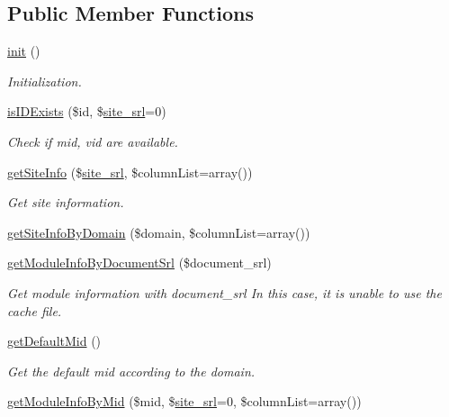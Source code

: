 \subsection*{Public Member Functions}
\begin{DoxyCompactItemize}
\item 
\hyperlink{classmoduleModel_a1d6fb4cdd3dd5e068e71cacc551f517c}{init} ()
\begin{DoxyCompactList}\small\item\em Initialization. \end{DoxyCompactList}\item 
\hyperlink{classmoduleModel_a5f53ae1101876e8967cc3c40e54badcd}{is\+I\+D\+Exists} (\$id, \$\hyperlink{ko_8install_8php_a8b1406b4ad1048041558dce6bfe89004}{site\+\_\+srl}=0)
\begin{DoxyCompactList}\small\item\em Check if mid, vid are available. \end{DoxyCompactList}\item 
\hyperlink{classmoduleModel_a96446e3b8e031ec1264c7187cb1384a5}{get\+Site\+Info} (\$\hyperlink{ko_8install_8php_a8b1406b4ad1048041558dce6bfe89004}{site\+\_\+srl}, \$column\+List=array())
\begin{DoxyCompactList}\small\item\em Get site information. \end{DoxyCompactList}\item 
\hyperlink{classmoduleModel_a6c4e1496c55c3c15507bb9532cb01c7f}{get\+Site\+Info\+By\+Domain} (\$domain, \$column\+List=array())
\item 
\hyperlink{classmoduleModel_a6b3ba81393e32a934f7bff65f05663d5}{get\+Module\+Info\+By\+Document\+Srl} (\$document\+\_\+srl)
\begin{DoxyCompactList}\small\item\em Get module information with document\+\_\+srl In this case, it is unable to use the cache file. \end{DoxyCompactList}\item 
\hyperlink{classmoduleModel_ae76b5be74783d11b676b167ba2c63523}{get\+Default\+Mid} ()
\begin{DoxyCompactList}\small\item\em Get the default mid according to the domain. \end{DoxyCompactList}\item 
\hyperlink{classmoduleModel_a543ca661568188ef493ff138246de29c}{get\+Module\+Info\+By\+Mid} (\$mid, \$\hyperlink{ko_8install_8php_a8b1406b4ad1048041558dce6bfe89004}{site\+\_\+srl}=0, \$column\+List=array())

\end{DoxyCompactItemize}

